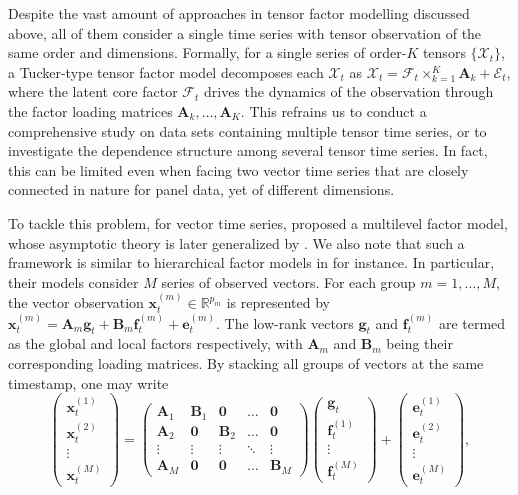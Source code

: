 \documentclass[aos]{imsart}
\theoremstyle{plain}
\theoremstyle{definition}
\def\R{\mathbb{R}}
\def\cE{\mathcal{E}}
\def\cF{\mathcal{F}}
\def\cX{\mathcal{X}}
\def\zero{\mathbf{0}}
\def\bx{\mathbf{x}}
\def\bA{\mathbf{A}}
\def\bB{\mathbf{B}}
\begin{document}
Despite the vast amount of approaches in tensor factor modelling discussed above, all of them consider a single time series with tensor observation of the same order and dimensions.
Formally, for a single series of order-$K$ tensors $\{\cX_t\}$, a Tucker-type tensor factor model decomposes each $\cX_t$ as $\cX_t = \cF_t \times_{k=1}^K \bA_k + \cE_t$, where the latent core factor $\cF_t$ drives the dynamics of the observation through the factor loading matrices $\bA_k, \dots, \bA_K$.
This refrains us to conduct a comprehensive study on data sets containing multiple tensor time series, or to investigate the dependence structure among several tensor time series. In fact, this can be limited even when facing two vector time series that are closely connected in nature for panel data, yet of different dimensions. 

To tackle this problem, for vector time series, \cite{Wang2008} proposed a multilevel factor model, whose asymptotic theory is later generalized by \cite{Choietal2018}. We also note that such a framework is similar to hierarchical factor models in \cite{Moenchetal2013} for instance. In particular, their models consider $M$ series of observed vectors. For each group $m=1,\dots,M$, the vector observation $\bx_t^{(m)}\in \R^{p_m}$ is represented by $\bx_t^{(m)} = \bA_m \mathbf{g}_t + \bB_m \mathbf{f}_t^{(m)} +\mathbf{e}_t^{(m)}$. The low-rank vectors $\mathbf{g}_t$ and $\mathbf{f}_t^{(m)}$ are termed as the global and local factors respectively, with $\bA_m$ and $\bB_m$ being their corresponding loading matrices. By stacking all groups of vectors at the same timestamp, one may write
\[
\begin{pmatrix}
    \bx_t^{(1)} \\ \bx_t^{(2)} \\ \vdots \\ \bx_t^{(M)}
\end{pmatrix} = \begin{pmatrix}
    \bA_1 & \bB_1 & \zero & \ldots & \zero \\
    \bA_2 & \zero & \bB_2 & \ldots & \zero \\
    \vdots & \vdots & \vdots & \ddots & \vdots \\
    \bA_M & \zero & \zero & \ldots & \bB_M
\end{pmatrix} \begin{pmatrix}
    \mathbf{g}_t \\ \mathbf{f}_t^{(1)} \\ \vdots \\ \mathbf{f}_t^{(M)}
\end{pmatrix} + \begin{pmatrix}
    \mathbf{e}_t^{(1)} \\ \mathbf{e}_t^{(2)} \\ \vdots \\ \mathbf{e}_t^{(M)}
\end{pmatrix} ,
\]
\end{document}
